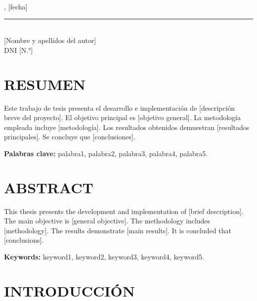 \documentclass[12pt, letterpaper, oneside]{book}
\begin{document}

\vspace{1cm}
\begin{flushright}
    [Lugar], [fecha] \\[1.5cm]
    \rule{6cm}{0.4pt} \\
    {[Nombre y apellidos del autor]} \\
    DNI {[N.°]}
\end{flushright}

\newpage
\chapter*{RESUMEN}

Este trabajo de tesis presenta el desarrollo e implementación de [descripción breve del proyecto]. El objetivo principal es [objetivo general]. La metodología empleada incluye [metodología]. Los resultados obtenidos demuestran [resultados principales]. Se concluye que [conclusiones].

\textbf{Palabras clave:} palabra1, palabra2, palabra3, palabra4, palabra5.

\vspace{1cm}

\chapter*{ABSTRACT}

This thesis presents the development and implementation of [brief description]. The main objective is [general objective]. The methodology includes [methodology]. The results demonstrate [main results]. It is concluded that [conclusions].

\textbf{Keywords:} keyword1, keyword2, keyword3, keyword4, keyword5.

\newpage
\tableofcontents
\newpage
\listoffigures
\newpage
\listoftables

\chapter{INTRODUCCIÓN}
\end{document}
